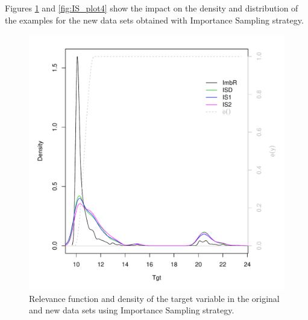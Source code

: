 \documentclass[10pt,a4paper]{article}\usepackage[]{graphicx}\usepackage[]{color}
\makeatletter
\def\maxwidth{ %
  \ifdim\Gin@nat@width>\linewidth
    \linewidth
  \else
    \Gin@nat@width
  \fi
}
\newenvironment{knitrout}{}{} %
\makeatother
\begin{document}
Figures \ref{fig:IS_plot3} and \ref{fig:IS_plot4} show the impact on the density and distribution of the examples for the new data sets obtained with Importance Sampling strategy.
\begin{knitrout}\footnotesize
{}\color{fgcolor}\begin{figure}

{\centering \includegraphics[width=\maxwidth]{figures/UBL-IS_plot3-1} 

}

\caption[Relevance function and density of the target variable in the original and new data sets using Importance Sampling strategy]{Relevance function and density of the target variable in the original and new data sets using Importance Sampling strategy.}\label{fig:IS_plot3}
\end{figure}


\end{knitrout}
\end{document}
